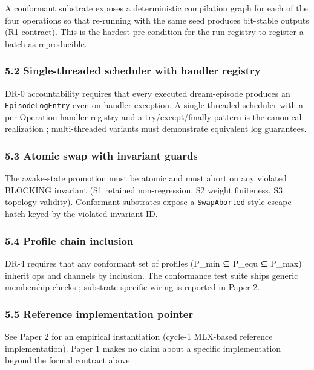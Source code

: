 \documentclass[
]{article}
\begin{document}
A conformant substrate exposes a deterministic compilation graph for
each of the four operations so that re-running with the same seed
produces bit-stable outputs (R1 contract). This is the hardest
pre-condition for the run registry to register a batch as reproducible.

\subsubsection{5.2 Single-threaded scheduler with handler
registry}\label{single-threaded-scheduler-with-handler-registry}

DR-0 accountability requires that every executed dream-episode produces
an \texttt{EpisodeLogEntry} even on handler exception. A single-threaded
scheduler with a per-Operation handler registry and a try/except/finally
pattern is the canonical realization ; multi-threaded variants must
demonstrate equivalent log guarantees.

\subsubsection{5.3 Atomic swap with invariant
guards}\label{atomic-swap-with-invariant-guards}

The awake-state promotion must be atomic and must abort on any violated
BLOCKING invariant (S1 retained non-regression, S2 weight finiteness, S3
topology validity). Conformant substrates expose a
\texttt{SwapAborted}-style escape hatch keyed by the violated invariant
ID.

\subsubsection{5.4 Profile chain
inclusion}\label{profile-chain-inclusion}

DR-4 requires that any conformant set of profiles (P\_min ⊆ P\_equ ⊆
P\_max) inherit ops and channels by inclusion. The conformance test
suite ships generic membership checks ; substrate-specific wiring is
reported in Paper 2.

\subsubsection{5.5 Reference implementation
pointer}\label{reference-implementation-pointer}

See Paper 2 for an empirical instantiation (cycle-1 MLX-based reference
implementation). Paper 1 makes no claim about a specific implementation
beyond the formal contract above.
\end{document}
